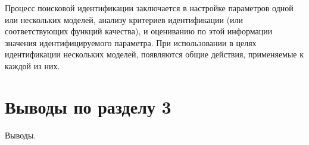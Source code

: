 
Процесс поисковой идентификации заключается в настройке параметров одной
или нескольких моделей, анализу критериев идентификации
(или соответствующих функций качества), и оцениванию по этой информации
значения идентифицируемого параметра. При использовании в целях идентификации нескольких моделей,
появляются общие действия, применяемые к каждой из них.





\section{Выводы по разделу 3}

Выводы.

